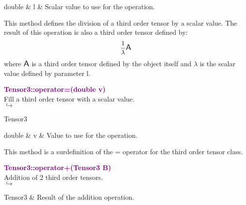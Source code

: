 \begin{tcolorbox}[width=\textwidth,myArgs,tabularx={ll|R}]
double & l & Scalar value to use for the operation.
\end{tcolorbox}

This method defines the division of a third order tensor by a scalar value.
The result of this operation is also a third order tensor defined by:
\begin{equation*}
\frac{1}{\lambda} \mbox{\large\ensuremath{\mathsf{A}}}
\end{equation*}
where $\mbox{\large\ensuremath{\mathsf{A}}}$ is a third order tensor defined by the object itself and $\lambda$ is the scalar value defined by parameter l.

\textcolor{purple}{\textbf{Tensor3::operator=(double v)}}\label{Tensor3::operator=(double v)}\\
Fill a third order tensor with a scalar value.\\ \hspace*{5mm}$\hookrightarrow$
\vspace*{-2em}\begin{tcolorbox}[grow to left by=-1cm, width=\textwidth-1cm,myArgs,tabularx={l|R}]
Tensor3
\end{tcolorbox}

\begin{tcolorbox}[width=\textwidth,myArgs,tabularx={ll|R}]
double & v & Value to use for the operation.
\end{tcolorbox}

This method is a surdefinition of the = operator for the third order tensor class.

\textcolor{purple}{\textbf{Tensor3::operator+(Tensor3 B)}}\label{Tensor3::operator+(Tensor3 B)}\\
Addition of 2 third order tensors.\\ \hspace*{5mm}$\hookrightarrow$
\vspace*{-2em}\begin{tcolorbox}[grow to left by=-1cm, width=\textwidth-1cm,myArgs,tabularx={l|R}]
Tensor3 & Result of the addition operation.
\end{tcolorbox}


